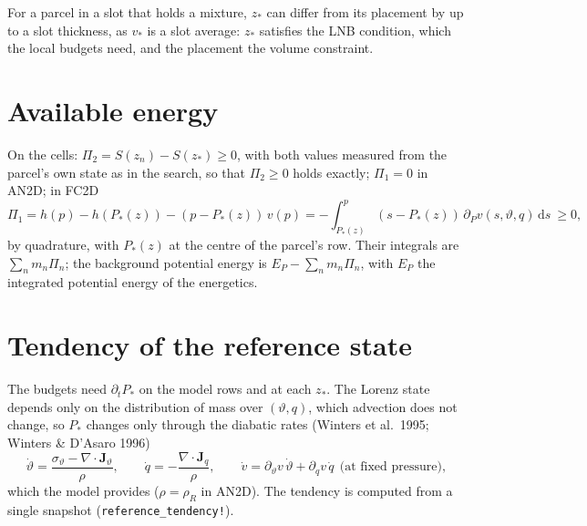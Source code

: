 \documentclass[11pt,a4paper]{article}
\newcommand{\vt}{\vartheta}
\newcommand{\code}[1]{\texttt{#1}}
\newcommand{\zs}{z_{*}}
\begin{document}
For a parcel in a slot that holds a mixture, $\zs$ can differ from its placement by up to a slot thickness, as $v_*$ is a slot
average: $\zs$ satisfies the LNB condition, which the local budgets need, and the placement the volume constraint.

\section{Available energy}\label{sec:ae}
On the cells: $\Pi_2=S(z_n)-S(\zs)\ge0$, with both values measured from the parcel's own state as in the search, so that
$\Pi_2\ge0$ holds exactly; $\Pi_1=0$ in AN2D; in FC2D
\begin{equation}
  \Pi_1=h(p)-h(P_*(z))-(p-P_*(z))\,v(p)=-\int_{P_*(z)}^{p}(s-P_*(z))\,\partial_Pv(s,\vt,q)\,\mathrm{d}s\ \ge0,
\end{equation}
by quadrature, with $P_*(z)$ at the centre of the parcel's row. Their integrals are $\sum_nm_n\Pi_n$; the background potential
energy is $E_P-\sum_nm_n\Pi_n$, with $E_P$ the integrated potential energy of the energetics.

\section{Tendency of the reference state}\label{sec:dtpstar}
The budgets need $\partial_tP_*$ on the model rows and at each $\zs$. The Lorenz state depends only on the distribution of mass
over $(\vt,q)$, which advection does not change, so $P_*$ changes only through the diabatic rates (Winters et al.\ 1995;
Winters \& D'Asaro 1996)
\begin{equation}
  \dot\vt=\frac{\sigma_\vt-\nabla\cdot\mathbf J_\vt}{\rho},\qquad \dot q=-\frac{\nabla\cdot\mathbf J_q}{\rho},\qquad
  \dot v=\partial_\vt v\,\dot\vt+\partial_qv\,\dot q\ \ \text{(at fixed pressure)},
\end{equation}
which the model provides ($\rho=\rho_R$ in AN2D). The tendency is computed from a single snapshot (\code{reference\_tendency!}).
\end{document}
